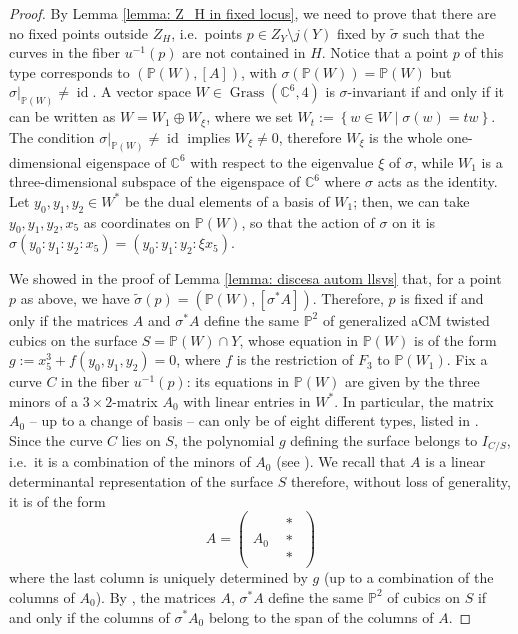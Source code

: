 \documentclass{amsart}
\theoremstyle{definition}
\newcommand{\coloneqq}{:=}
\DeclareMathOperator{\id}{id}
\DeclareMathOperator{\grass}{Grass}
\begin{document}
\begin{proof}
By Lemma \ref{lemma: Z_H in fixed locus}, we need to prove that there are no fixed points outside $Z_H$, i.e.\ points $p \in Z_Y \setminus j(Y)$ fixed by $\tilde{\sigma}$ such that the curves in the fiber $u^{-1}(p)$ are not contained in $H$. Notice that a point $p$ of this type corresponds to $(\mathbb{P}(W), [A])$, with $\sigma(\mathbb{P}(W)) = \mathbb{P}(W)$ but $\sigma\vert_{\mathbb{P}(W)} \neq \id$. A vector space $W \in \grass(\mathbb{C}^6,4)$ is $\sigma$-invariant if and only if it can be written as $W = W_1 \oplus W_\xi$, where we set \mbox{$W_t \coloneqq \left\{ w \in W \mid \sigma(w) = tw \right\}$}. The condition $\sigma\vert_{\mathbb{P}(W)} \neq \id$ implies $W_\xi \neq 0$, therefore $W_\xi$ is the whole one-dimensional eigenspace of $\mathbb{C}^6$ with respect to the eigenvalue $\xi$ of $\sigma$, while $W_1$ is a three-dimensional subspace of the eigenspace of $\mathbb{C}^6$ where $\sigma$ acts as the identity. Let $y_0,y_1,y_2 \in W^*$ be the dual elements of a basis of $W_1$; then, we can take $y_0,y_1,y_2,x_5$ as coordinates on $\mathbb{P}(W)$, so that the action of $\sigma$ on it is $\sigma(y_0:y_1:y_2:x_5) = (y_0: y_1:y_2:\xi x_5)$.

We showed in the proof of Lemma \ref{lemma: discesa autom llsvs} that, for a point $p$ as above, we have $\tilde{\sigma}(p) = (\mathbb{P}(W), [\sigma^* A])$. Therefore, $p$ is fixed if and only if the matrices $A$ and $\sigma^* A$ define the same $\mathbb{P}^2$ of generalized aCM twisted cubics on the surface $S=\mathbb{P}(W) \cap Y$, whose equation in $\mathbb{P}(W)$ is of the form $g \coloneqq x_5^3 + f(y_0,y_1,y_2) = 0$, where $f$ is the restriction of $F_3$ to $\mathbb{P}(W_1)$. 
Fix a curve $C$ in the fiber $u^{-1}(p)$: its equations in $\mathbb{P}(W)$ are given by the three minors of a $3\times 2$-matrix $A_0$ with linear entries in $W^*$. In particular, the matrix $A_0$ -- up to a change of basis -- can only be of eight different types, listed in \cite[\S 1]{llsvs}. Since the curve $C$ lies on $S$, the polynomial $g$ defining the surface belongs to $I_{C/S}$, i.e.\ it is a combination of the minors of $A_0$ (see \cite[\S 3.1]{llsvs}). We recall that $A$ is a linear determinantal representation of the surface $S$ therefore, without loss of generality, it is of the form
\begin{equation*}
\renewcommand{\arraystretch}{0.5}
A = \left( \begin{array}{c|c}
A_0 & \begin{matrix}
* \\ * \\ *
\end{matrix}
\end{array} \right)
\end{equation*}
\noindent where the last column is uniquely determined by $g$ (up to a combination of the columns of $A_0$). By \cite[\S 3.1]{llsvs}, the matrices $A$, $\sigma^* A$ define the same $\mathbb{P}^2$ of cubics on $S$ if and only if the columns of $\sigma^* A_0$ belong to the span of the columns of $A$. 


\end{proof}
\end{document}
